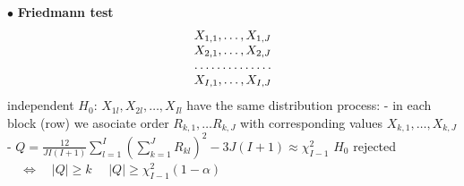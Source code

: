\documentclass[twoside]{book}
\begin{document}
\pagestyle{empty}

\def\dr #1{\par\noindent $\bullet$ {\bf #1}}


\dr{Friedmann test}
\begin{multline*}\begin{array}{l}
X_{1,1},\dots,X_{1,J}  \\
X_{2,1},\dots,X_{2,J}   \\
\hdotsfor{1}  \\
X_{I,1},\dots,X_{I,J}
\end{array}   \end{multline*}
\hspace*{80mm} independent
\newline $H_0$: $X_{1l}, X_{2l}, \dots, X_{Il}$ have the same distribution
\newline
process:
\newline - in each block (row) we asociate order $R_{k,1}, \dots R_{k,J}$ with corresponding values $X_{k,1},\dots, X_{k,J} $
\newline - $ Q=\frac{12}{JI(I+1)} \sum_{l=1}^{I} \left(\sum_{k=1}^{J} R_{kl}\right)^2  -3J(I+1)\approx \chi^2_{I-1}$
\newline $H_0$  rejected $\quad \Longleftrightarrow\quad |Q| \geq k$
\newline \phantom{$H_0$  rejected $\quad \Longleftrightarrow$} $\quad |Q| \geq \chi^2_{I-1}(1-\alpha)$
\end{document}
